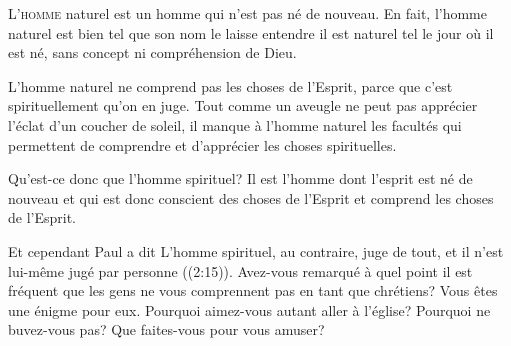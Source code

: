 \dvrule







\lettrine{L}{'homme} naturel est un homme qui n'est pas né de nouveau.
 En fait, l'homme naturel est bien tel que son nom le laisse entendre
 \ocadr il est naturel tel le jour où il est né,
 sans concept ni compréhension de Dieu.

L'homme naturel ne comprend pas les choses de l'Esprit,
 parce que c'est spirituellement qu'on en juge.
 Tout comme un aveugle ne peut pas apprécier l'éclat d'un coucher de soleil,
 il manque à l'homme naturel les facultés qui permettent
 de comprendre et d'apprécier les choses spirituelles.


Qu'est-ce donc que l'homme spirituel?
 Il est l'homme dont l'esprit est né de nouveau
 et qui est donc conscient des choses de l'Esprit
 et comprend les choses de l'Esprit.

Et cependant Paul a dit\frcolon{} 
 \Og L'homme spirituel, au contraire, juge de tout,
 et il n'est lui-même jugé par personne \Fg{}
 ((2:15)).
 Avez-vous remarqué à quel point il est fréquent
 que les gens ne vous comprennent
 pas en tant que chrétiens? Vous êtes une énigme pour eux.
 \Og Pourquoi aimez-vous autant aller à l'église?
 Pourquoi ne buvez-vous pas? Que faites-vous pour vous amuser? \Fg{}

